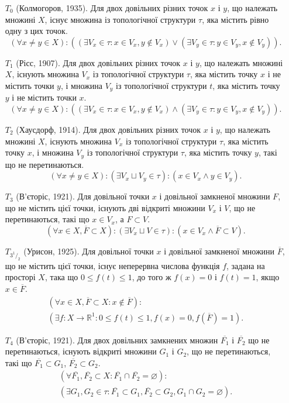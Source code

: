 \documentclass[a4paper, 12pt]{article}
\newcommand{\RR}{\mathbb{R}}
\renewcommand{\emptyset}{\varnothing}
\newcommand{\rfrac}[2]{^{#1\!}/_{#2}}
\begin{document}
\begin{enumerate}
	\item[$T_0$ (Колмогоров, 1935).] Для двох довільних різних точок
	$x$ і $y$, що належать множині $X$, існує множина із
	топологічної структури $\tau$, яка містить рівно одну з цих
	точок.
	\[ (\forall x \ne y \in X): ((\exists V_x \in \tau: x \in V_x, y \notin V_x) \lor (\exists V_y \in \tau: y \in V_y, x \notin V_y)). \]

	\item [$T_1$ (Рісс, 1907).] Для двох довільних різних точок $x$ і $y$,
	що належать множині $X$, існують множина $V_x$ із
	топологічної структури $\tau$, яка містить точку $x$ і не
	містить точки $y$, і множина $V_y$ із топологічної
	структури $t$, яка містить точку $y$ і не містить точки $x$.
	\[ (\forall x \ne y \in X): ((\exists V_x \in \tau: x \in V_x, y \notin V_x) \land (\exists V_y \in \tau: y \in V_y, x \notin V_y)). \]

	\item[$T_2$ (Хаусдорф, 1914).] Для двох довільних різних точок $x$ і
	$y$, що належать множині $X$, існують множина $V_x$ із
	топологічної структури $\tau$, яка містить точку $x$, і
	множина $V_y$ із топологічної структури $\tau$, яка містить
	точку $y$, такі що не перетинаються.
	\[ (\forall x \ne y \in X): (\exists V_x \sqcup V_y \in \tau): (x \in V_x \land y \in V_y). \]

	\item[$T_3$ (В'єторіс, 1921).] Для довільної точки $x$ і довільної
	замкненої множини $F$, що не містить цієї точки, існують
	дві відкриті множини $V_x$ і $V$, що не перетинаються, такі
	що $x \in V_x$, а $F \subset V$.
	\[ (\forall x \in X, \overline{F} \subset X): (\exists V_x \sqcup V \in \tau): (x \in V_x \land \overline{F} \subset V). \]

	\item[$T_{3\rfrac{1}{2}}$ (Урисон, 1925).] Для довільної точки $x$ і довільної
	замкненої множини $\overline{F}$, що не містить цієї точки, існує
	неперервна числова функція $f$, задана на просторі $X$,
	така що $0 \le f(t) \le 1$, до того ж $f(x) = 0$ і $f(t) = 1$, якщо
	$x \in \overline{F}$.
	\begin{multline*}
		(\forall x \in X, \overline{F} \subset X: x \notin \overline{F}): \\
		(\exists f: X \to \RR^1: 0 \le f(t) \le 1, f(x) = 0, f(\overline{F}) = 1).
	\end{multline*}

	\item[$T_4$ (В'єторіс, 1921).] Для двох довільних замкнених
	множин $\overline{F_1}$ і $\overline{F_2}$ що не перетинаються, існують відкриті
	множини $G_1$ і $G_2$, що не перетинаються, такі що $\overline{F_1} \subset G_1$, $\overline{F_2} \subset G_2$.
	\begin{multline*}
		(\forall \overline{F_1}, \overline{F_2} \subset X: \overline{F_1} \cap \overline{F_2} = \emptyset): \\
		(\exists G_1, G_2 \in \tau: \overline{F_1} \subset G_1, \overline{F_2} \subset G_2, G_1 \cap G_2 = \emptyset).
	\end{multline*}
\end{enumerate}
\end{document}
